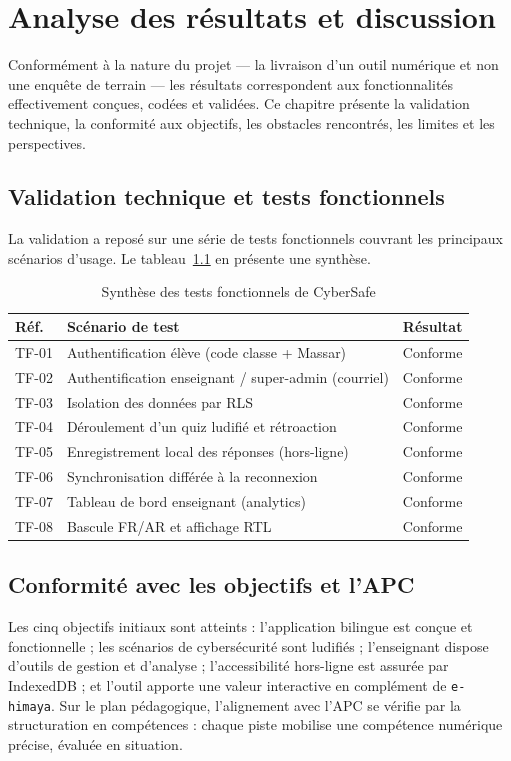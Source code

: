 \documentclass[12pt, a4paper, oneside]{report}
\begin{document}
\chapter{Analyse des résultats et discussion}

Conformément à la nature du projet — la livraison d'un outil numérique et non une enquête de terrain — les résultats correspondent aux fonctionnalités effectivement conçues, codées et validées. Ce chapitre présente la validation technique, la conformité aux objectifs, les obstacles rencontrés, les limites et les perspectives.

\section{Validation technique et tests fonctionnels}
La validation a reposé sur une série de tests fonctionnels couvrant les principaux scénarios d'usage. Le tableau~\ref{tab:tests} en présente une synthèse.

\begin{table}[H]
\centering
\caption{Synthèse des tests fonctionnels de CyberSafe}
\label{tab:tests}
\begin{tabularx}{\textwidth}{@{}l X c@{}}
\toprule
\textbf{Réf.} & \textbf{Scénario de test} & \textbf{Résultat} \\
\midrule
TF-01 & Authentification élève (code classe + Massar) & Conforme \\
TF-02 & Authentification enseignant / super-admin (courriel) & Conforme \\
TF-03 & Isolation des données par RLS & Conforme \\
TF-04 & Déroulement d'un quiz ludifié et rétroaction & Conforme \\
TF-05 & Enregistrement local des réponses (hors-ligne) & Conforme \\
TF-06 & Synchronisation différée à la reconnexion & Conforme \\
TF-07 & Tableau de bord enseignant (analytics) & Conforme \\
TF-08 & Bascule FR/AR et affichage RTL & Conforme \\
\bottomrule
\end{tabularx}
\end{table}

\section{Conformité avec les objectifs et l'APC}
Les cinq objectifs initiaux sont atteints : l'application bilingue est conçue et fonctionnelle ; les scénarios de cybersécurité sont ludifiés ; l'enseignant dispose d'outils de gestion et d'analyse ; l'accessibilité hors-ligne est assurée par IndexedDB ; et l'outil apporte une valeur interactive en complément de \texttt{e-himaya}. Sur le plan pédagogique, l'alignement avec l'APC se vérifie par la structuration en compétences : chaque piste mobilise une compétence numérique précise, évaluée en situation.
\end{document}

